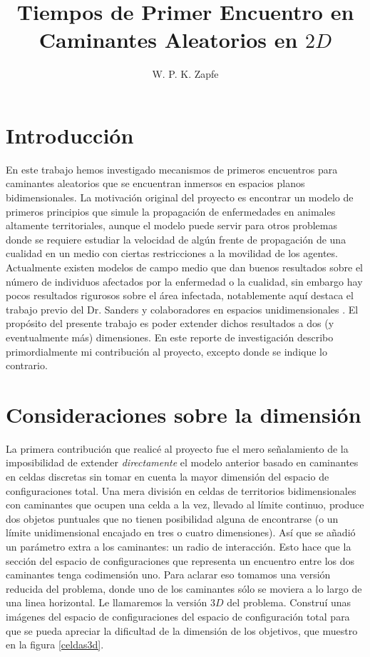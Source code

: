 \documentclass[letterpaperr,12pt]{article}
\title{Tiempos de Primer Encuentro en Caminantes Aleatorios en $2D$}
\author{W. P. K. Zapfe}
\begin{document}
\maketitle

\section{Introducción}

En este trabajo hemos investigado mecanismos de primeros encuentros
para caminantes aleatorios que se encuentran inmersos en espacios
planos bidimensionales. La motivación original del proyecto es encontrar
un modelo de primeros principios que simule la propagación de enfermedades
en animales altamente territoriales, aunque el modelo puede servir
para otros problemas donde se requiere estudiar la velocidad
de algún frente de propagación de una cualidad en un medio con ciertas
restricciones a la movilidad de los agentes. Actualmente existen
modelos de campo medio que dan buenos resultados sobre el número
de individuos afectados por la enfermedad o la cualidad, sin embargo
hay pocos resultados rigurosos sobre el área infectada, notablemente
aquí destaca el trabajo previo del Dr. Sanders y colaboradores 
en espacios unidimensionales \cite{SandersLuca}.
El propósito del presente trabajo es poder extender dichos resultados
a dos (y eventualmente más) dimensiones. En este reporte de investigación
describo primordialmente mi contribución al proyecto, excepto
donde se indique lo contrario. 

\section{Consideraciones sobre la dimensión}

La primera contribución que realicé al proyecto fue el mero señalamiento
de la imposibilidad de extender \emph{directamente} el modelo anterior
basado en caminantes en celdas discretas sin tomar en cuenta
la mayor dimensión del espacio de configuraciones total.
Una mera división en celdas de territorios bidimensionales con
caminantes que ocupen una celda a la vez, llevado al  límite continuo,
produce dos objetos puntuales que no tienen posibilidad alguna 
de encontrarse (o un límite unidimensional encajado en tres o cuatro
dimensiones). Así 
que se añadió un parámetro extra a los caminantes: un radio de interacción.
Esto hace que la sección del espacio de configuraciones que
representa un encuentro entre los dos caminantes tenga codimensión
uno. Para aclarar eso tomamos una versión reducida del problema,
donde uno de los caminantes sólo se moviera a lo largo de una
linea horizontal. Le llamaremos la versión $3D$ del problema. Construí
unas imágenes del espacio de configuraciones del espacio de configuración
total para que se pueda apreciar la dificultad de la dimensión de los
objetivos, que muestro en la figura \ref{celdas3d}. 
\end{document}
